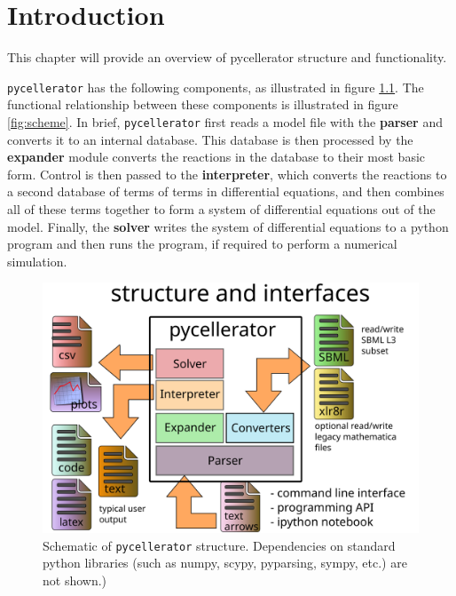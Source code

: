 \chapter{Introduction}

This chapter will provide an overview of pycellerator structure and functionality. 

{\tt pycellerator} has the following components, as illustrated in figure \ref{fig:structure}. The functional relationship between these components is illustrated in figure \ref{fig:scheme}. In brief, {\tt pycellerator} first reads a model file with the \textbf{parser} and converts it to an internal database. This database is then processed by the \textbf{expander} module converts the reactions in the database to their most basic form. Control is then passed to the \textbf{interpreter}, which converts the reactions to a second database of terms of terms in differential equations, and then combines all of these terms together to form a system of differential equations out of the model. Finally, the \textbf{solver} writes the system of differential equations to a python program and then runs the program, if required to perform a numerical simulation. 

\begin{figure}[ht]
\caption{Schematic of {\tt pycellerator} structure.  Dependencies on standard python libraries (such as numpy, scypy, pyparsing, sympy, etc.) are not shown.)}\label{fig:structure}
\begin{center}
\includegraphics[width=.75\textwidth]{pyxlr8r-structure}
\end{center}
\end{figure}


